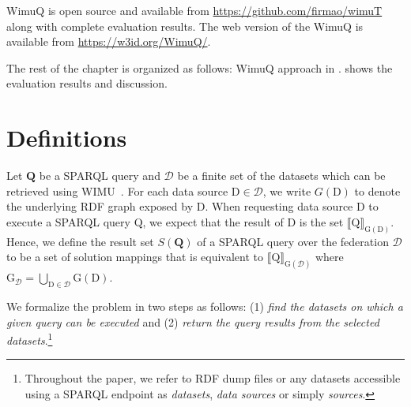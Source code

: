 \begin{itemize}
    
    
    
\end{itemize}

WimuQ is open source and available from \url{https://github.com/firmao/wimuT} along with complete evaluation results. The web version of the WimuQ is available from  \url{https://w3id.org/WimuQ/}. 

The rest of the chapter is organized as follows:
WimuQ approach in .  shows the evaluation results and discussion.

\section{Definitions} \label{preliminaries}

Let $\mathbf{Q}$ be a SPARQL query and $\mathcal{D}$ be a finite set of the datasets which can be retrieved using WIMU~\cite{valdestilhas2018my}.
For each data source $\mathrm{D} \in \mathcal{D}$, we write $G(\mathrm{D})$ to denote the underlying RDF graph exposed by $\mathrm{D}$. 
When requesting data source $\mathrm{D}$ to execute a SPARQL query $\mathrm{Q}$, we expect that the result of $\mathrm{D}$ is the set ${\llbracket \mathrm{Q} \rrbracket}_{\mathrm{G}(\mathrm{D})}$. 
Hence, we define the result set $S(\mathbf{Q})$ of a SPARQL query over the federation $\mathcal{D}$ to be a set of solution mappings that is equivalent to ${\llbracket \mathrm{Q} \rrbracket}_{\mathrm{G}(\mathcal{D})}$ where $\mathrm{G}_\mathcal{D}=\bigcup_{\mathrm{D} \in \mathcal{D}} \mathrm{G}(\mathrm{D})$.

We formalize the problem in two steps as follows: (1) \emph{find the datasets on which a given query can be executed} and (2) \emph{return the query results from the selected datasets}.\footnote{Throughout the paper, we refer to RDF dump files or any datasets accessible using a SPARQL endpoint as \emph{datasets}, \emph{data sources} or simply \emph{sources}.}

